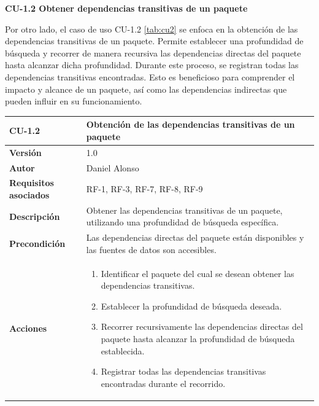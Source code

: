 \textbf{CU-1.2 Obtener dependencias transitivas de un paquete}

Por otro lado, el caso de uso CU-1.2 \ref{tab:cu2} se enfoca en la obtención de las dependencias transitivas de un paquete. 
Permite establecer una profundidad de búsqueda y recorrer de manera recursiva las dependencias directas del 
paquete hasta alcanzar dicha profundidad. Durante este proceso, se registran todas las dependencias transitivas 
encontradas. Esto es beneficioso para comprender el impacto y alcance de un paquete, así como las dependencias 
indirectas que pueden influir en su funcionamiento.

\begin{table}[p]
	\centering
	\begin{tabularx}{\linewidth}{ p{} p{} }
		\toprule
		\textbf{CU-1.2}                 & \textbf{Obtención de las dependencias transitivas de un paquete}                                       \\
		\toprule
		\textbf{Versión}              & 1.0                                                                                                    \\
		\textbf{Autor}                & Daniel Alonso                                                                                          \\
		\textbf{Requisitos asociados} & RF-1, RF-3, RF-7, RF-8, RF-9                                                                           \\
		\textbf{Descripción}          & Obtener las dependencias transitivas de un paquete, utilizando una profundidad de búsqueda específica. \\
		\textbf{Precondición}         & Las dependencias directas del paquete están disponibles y las fuentes de datos son accesibles.         \\
		\textbf{Acciones}             &
		\begin{enumerate}
			\def\labelenumi{\arabic{enumi}.}
			\tightlist
			\item Identificar el paquete del cual se desean obtener las dependencias transitivas.
			\item Establecer la profundidad de búsqueda deseada.
			\item Recorrer recursivamente las dependencias directas del paquete hasta alcanzar la profundidad de búsqueda establecida.
			\item Registrar todas las dependencias transitivas encontradas durante el recorrido.

\end{enumerate}
\end{tabularx}
\end{table}
